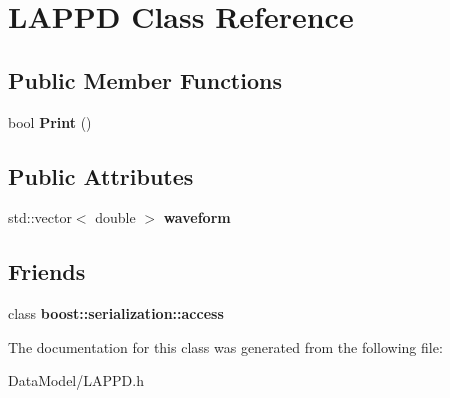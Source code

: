 \hypertarget{classLAPPD}{
\section{LAPPD Class Reference}
\label{classLAPPD}
}
\subsection*{Public Member Functions}
\begin{DoxyCompactItemize}
\item 
\hypertarget{classLAPPD_a6ef9e3c05e38b61c75cd12822ab5ce98}{
bool {\bfseries Print} ()}
\label{classLAPPD_a6ef9e3c05e38b61c75cd12822ab5ce98}

\end{DoxyCompactItemize}
\subsection*{Public Attributes}
\begin{DoxyCompactItemize}
\item 
\hypertarget{classLAPPD_a1b6bdd53a3523932fe22ad3b5471c91b}{
std::vector$<$ double $>$ {\bfseries waveform}}
\label{classLAPPD_a1b6bdd53a3523932fe22ad3b5471c91b}

\end{DoxyCompactItemize}
\subsection*{Friends}
\begin{DoxyCompactItemize}
\item 
\hypertarget{classLAPPD_ac98d07dd8f7b70e16ccb9a01abf56b9c}{
class {\bfseries boost::serialization::access}}
\label{classLAPPD_ac98d07dd8f7b70e16ccb9a01abf56b9c}

\end{DoxyCompactItemize}


The documentation for this class was generated from the following file:\begin{DoxyCompactItemize}
\item 
DataModel/LAPPD.h\end{DoxyCompactItemize}
